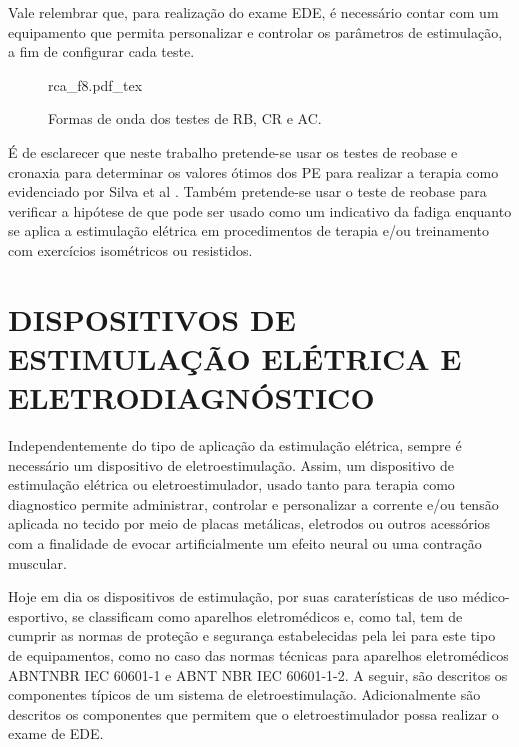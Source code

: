 Vale relembrar que, para realização do exame \acrshort{EDE}, é necessário contar com um equipamento que permita personalizar e controlar os parâmetros de estimulação, a fim de configurar cada teste.

\begin{figure*}[ht]
    \centering %
    \small %
    \def\svgwidth{1\columnwidth}%
    {rca_f8.pdf_tex}
    \caption{Formas de onda dos testes de \acrshort{RB}, \acrshort{CR} e \acrshort{AC}.}
    \label{fig:rca_f8}
\end{figure*}

É de esclarecer que neste trabalho pretende-se usar os testes de reobase e cronaxia para determinar os valores ótimos dos PE para realizar a terapia como evidenciado por Silva et al \cite{Silva2016}. Também pretende-se usar o teste de reobase para verificar a hipótese de que pode ser usado como um indicativo da fadiga enquanto se aplica a estimulação elétrica em procedimentos de terapia e/ou treinamento com exercícios isométricos ou resistidos.


\section{DISPOSITIVOS DE ESTIMULAÇÃO ELÉTRICA E ELETRODIAGNÓSTICO}
Independentemente do tipo de aplicação da estimulação elétrica, sempre é necessário um dispositivo de eletroestimulação. Assim, um dispositivo de estimulação elétrica ou eletroestimulador, usado tanto para terapia como diagnostico permite administrar, controlar e personalizar a corrente e/ou tensão aplicada no tecido por meio de placas metálicas, eletrodos ou outros acessórios com a finalidade de evocar artificialmente um efeito neural ou uma contração muscular.

Hoje em dia os dispositivos de estimulação, por suas caraterísticas de uso médico-esportivo, se classificam como aparelhos eletromédicos e, como tal, tem de cumprir as normas de proteção e segurança estabelecidas pela lei para este tipo de equipamentos, como no caso das normas técnicas para aparelhos eletromédicos \acrshort{ABNT}\acrshort{NBR} \acrshort{IEC} 60601-1 e \acrshort{ABNT} \acrshort{NBR} \acrshort{IEC} 60601-1-2.
A seguir, são descritos os componentes típicos de um sistema de eletroestimulação. Adicionalmente são descritos os componentes que permitem que o eletroestimulador possa realizar o exame de \acrshort{EDE}.


